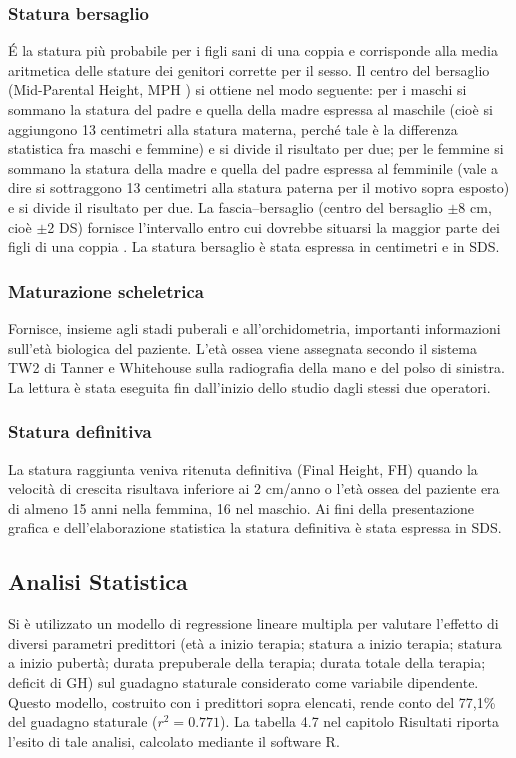 \subsubsection*{Statura bersaglio}
\'E  la statura più probabile per i figli sani di una coppia e corrisponde alla media aritmetica delle stature dei genitori corrette per il sesso. Il centro del bersaglio (Mid-Parental Height, MPH ) si ottiene nel modo seguente: per i maschi si sommano la statura del padre e quella della madre espressa al maschile (cioè si aggiungono 13 centimetri alla statura materna, perché tale è la differenza statistica fra maschi e femmine) e si divide il risultato per due; per le femmine si sommano la statura della madre e quella del padre espressa al femminile (vale a dire si sottraggono 13 centimetri alla statura paterna per il motivo sopra esposto) e si divide il risultato per due. 
La fascia--bersaglio (centro del bersaglio $\pm$8 cm, cioè $\pm$2 DS) fornisce l'intervallo entro cui dovrebbe situarsi la maggior parte dei figli di una coppia \cite{tanner1990foetus}.
La statura bersaglio è stata espressa in centimetri e in SDS.


\subsubsection*{Maturazione scheletrica}
Fornisce, insieme agli stadi puberali e all'orchidometria, importanti informazioni sull'età biologica del paziente. L'età ossea viene assegnata secondo il sistema TW2 di Tanner e Whitehouse\cite{tanner1983assessment} sulla radiografia della mano e del polso di sinistra. La lettura è stata eseguita fin dall'inizio dello studio dagli stessi due operatori.


\subsubsection*{Statura definitiva}
La statura raggiunta veniva ritenuta definitiva (Final Height, FH) quando la velocità di crescita risultava inferiore ai 2 cm/anno o l'età ossea del paziente era di almeno 15 anni nella femmina, 16 nel maschio.
Ai fini della presentazione grafica e dell'elaborazione statistica la statura definitiva è stata espressa in SDS.




\subsection{Analisi Statistica}
Si è utilizzato un modello di regressione lineare multipla per valutare l'effetto di diversi parametri predittori (età a inizio terapia; statura a inizio terapia; statura a inizio pubertà; durata prepuberale della terapia; durata totale della terapia; deficit di GH) sul guadagno staturale considerato come variabile dipendente. 
Questo modello, costruito con i predittori sopra elencati, rende conto del 77,1\% del guadagno staturale ($r^2 = 0.771$).
La tabella 4.7 nel capitolo Risultati riporta l'esito di tale analisi, calcolato mediante il software R. 
